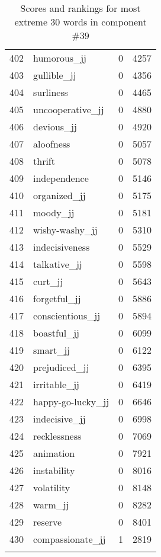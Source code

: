\begin{longtable}[!htbp]{| rlr@{.}l |}
    402 & humorous\_jj & 0 & 4257 \\
    403 & gullible\_jj & 0 & 4356 \\
    404 & surliness & 0 & 4465 \\
    405 & uncooperative\_jj & 0 & 4880 \\
    406 & devious\_jj & 0 & 4920 \\
    407 & aloofness & 0 & 5057 \\
    408 & thrift & 0 & 5078 \\
    409 & independence & 0 & 5146 \\
    410 & organized\_jj & 0 & 5175 \\
    411 & moody\_jj & 0 & 5181 \\
    412 & wishy-washy\_jj & 0 & 5310 \\
    413 & indecisiveness & 0 & 5529 \\
    414 & talkative\_jj & 0 & 5598 \\
    415 & curt\_jj & 0 & 5643 \\
    416 & forgetful\_jj & 0 & 5886 \\
    417 & conscientious\_jj & 0 & 5894 \\
    418 & boastful\_jj & 0 & 6099 \\
    419 & smart\_jj & 0 & 6122 \\
    420 & prejudiced\_jj & 0 & 6395 \\
    421 & irritable\_jj & 0 & 6419 \\
    422 & happy-go-lucky\_jj & 0 & 6646 \\
    423 & indecisive\_jj & 0 & 6998 \\
    424 & recklessness & 0 & 7069 \\
    425 & animation & 0 & 7921 \\
    426 & instability & 0 & 8016 \\
    427 & volatility & 0 & 8148 \\
    428 & warm\_jj & 0 & 8282 \\
    429 & reserve & 0 & 8401 \\
    430 & compassionate\_jj & 1 & 2819 \\
    \hline
    \caption{Scores and rankings for most extreme 30 words in component \#39} \\
\end{longtable}
